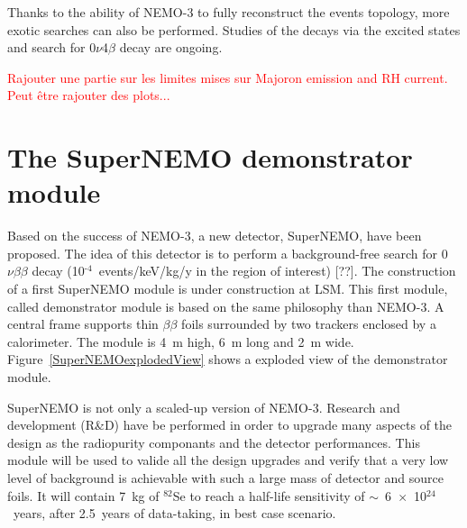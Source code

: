 \documentclass[main.tex]{subfiles}
\begin{document}
\NI Thanks to the ability of NEMO-3 to fully reconstruct the events topology, more exotic searches can also be performed. Studies of the decays via the excited states and search for 0$\nu$4$\beta$ decay are ongoing.

\bigskip


\NI \textcolor{red}{Rajouter une partie sur les limites mises sur Majoron emission and RH current. Peut être rajouter des plots...}


\FloatBarrier

\newpage


\section{The SuperNEMO demonstrator module}\label{sec:SuperNEMO}


\NI Based on the success of NEMO-3, a new detector, SuperNEMO, have been proposed. The idea of this detector is to perform a background-free search for 0$\nu\beta\beta$ decay (10$^{\text{-4}}$~events/keV/kg/y in the region of interest) [??]. The construction of a first SuperNEMO module is under construction at LSM. This first module, called demonstrator module is based on the same philosophy than NEMO-3. A central frame supports thin $\beta\beta$ foils surrounded by two trackers enclosed by a calorimeter. The module is 4~m high, 6~m long and 2~m wide. Figure~\ref{SuperNEMOexplodedView} shows a exploded view of the demonstrator module.


\bigskip


\NI SuperNEMO is not only a scaled-up version of NEMO-3. Research and development (R\&D) have be performed in order to upgrade many aspects of the design as the radiopurity componants and the detector performances. This module will be used to valide all the design upgrades and verify that a very low level of background is achievable with such a large mass of detector and source foils. It will contain 7~kg of $^{\text{82}}$Se to reach a half-life sensitivity of $\sim$~6~$\times$~10$^{\text{24}}$~years, after 2.5~years of data-taking, in best case scenario.
\end{document}
